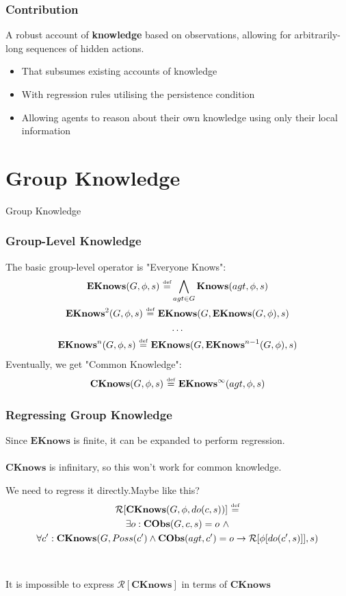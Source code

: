 \documentclass{beamer}
\newcommand{\isdef}{\hbox{$\stackrel{\mbox{\tiny def}}{=}$}}
\begin{document}
\begin{frame}
\frametitle{Contribution}
A robust account of \textbf{knowledge} based on observations, allowing for
arbitrarily-long sequences of hidden actions.
\begin{itemize}
\item That subsumes existing accounts of knowledge
\item With regression rules utilising the persistence condition
\item Allowing agents to reason about their own knowledge using only their local information
\end{itemize}
\end{frame}

\section{Group Knowledge}

\begin{frame}
\centering \large Group Knowledge\\
\end{frame}


\begin{frame}
\frametitle{Group-Level Knowledge}
The basic group-level operator is "Everyone Knows":
\begin{gather*}
\mathbf{EKnows}(G,\phi,s)\ \isdef \bigwedge_{agt \in G} \mathbf{Knows}(agt,\phi,s)\\
\mathbf{EKnows}^{2}(G,\phi,s)\ \isdef\ \mathbf{EKnows}(G,\mathbf{EKnows}(G,\phi),s)\\
\dots \\
\mathbf{EKnows}^{n}(G,\phi,s)\ \isdef\ \mathbf{EKnows}(G,\mathbf{EKnows}^{n-1}(G,\phi),s)
\end{gather*}
\pause
Eventually, we get "Common Knowledge":
\begin{gather*}
\mathbf{CKnows}(G,\phi,s)\ \isdef\ \mathbf{EKnows}^{\infty}(agt,\phi,s)
\end{gather*}
\end{frame}

\begin{frame}
\frametitle{Regressing Group Knowledge}
Since $\mathbf{EKnows}$ is finite, it can be expanded to perform regression.
\ \\
\ \\
$\mathbf{CKnows}$ is infinitary, so this won't work for common knowledge.

We need to regress it directly.\pause Maybe like this?
\begin{multline*}
\mathcal{R}[\mathbf{CKnows}(G,\phi,do(c,s))]\ \isdef \\
\exists o: \mathbf{CObs}(G,c,s)=o\ \wedge\\
\forall c': \mathbf{CKnows}(G,Poss(c') \wedge \mathbf{CObs}(agt,c')=o \rightarrow \mathcal{R}[\phi[do(c',s)]],s)
\end{multline*}
\ \\
\ \\
\pause
It is \alert{impossible} to express $\mathcal{R}[\mathbf{CKnows}]$ in terms of $\mathbf{CKnows}$
\end{frame}
\end{document}

